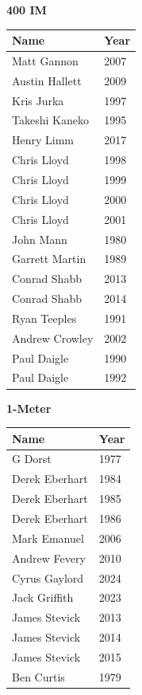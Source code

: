 \vspace{1.2em}
\noindent\begin{minipage}[t]{0.48\textwidth}
\centering
\textbf{\textcolor{teamprimary}{400 IM}}\par
\vspace{0.5em}
\centering
\small
\renewcommand{\arraystretch}{1.0}
\setlength{\tabcolsep}{4pt}
\begin{tabular}{@{}p{3.0cm}p{1.0cm}@{}}
\toprule
\textbf{Name} & \textbf{Year} \\
\midrule
Matt Gannon & 2007 \\
Austin Hallett & 2009 \\
Kris Jurka & 1997 \\
Takeshi Kaneko & 1995 \\
Henry Limm & 2017 \\
Chris Lloyd & 1998 \\
Chris Lloyd & 1999 \\
Chris Lloyd & 2000 \\
Chris Lloyd & 2001 \\
John Mann & 1980 \\
Garrett Martin & 1989 \\
Conrad Shabb & 2013 \\
Conrad Shabb & 2014 \\
Ryan Teeples & 1991 \\
Andrew Crowley & 2002 \\
Paul Daigle & 1990 \\
Paul Daigle & 1992 \\
\bottomrule
\end{tabular}
\end{minipage}
\hfill
\begin{minipage}[t]{0.48\textwidth}
\centering
\textbf{\textcolor{teamprimary}{1-Meter}}\par
\vspace{0.5em}
\centering
\small
\renewcommand{\arraystretch}{1.0}
\setlength{\tabcolsep}{4pt}
\begin{tabular}{@{}p{3.0cm}p{1.0cm}@{}}
\toprule
\textbf{Name} & \textbf{Year} \\
\midrule
G Dorst & 1977 \\
Derek Eberhart & 1984 \\
Derek Eberhart & 1985 \\
Derek Eberhart & 1986 \\
Mark Emanuel & 2006 \\
Andrew Fevery & 2010 \\
Cyrus Gaylord & 2024 \\
Jack Griffith & 2023 \\
James Stevick & 2013 \\
James Stevick & 2014 \\
James Stevick & 2015 \\
Ben Curtis & 1979 \\
\bottomrule
\end{tabular}
\end{minipage}
